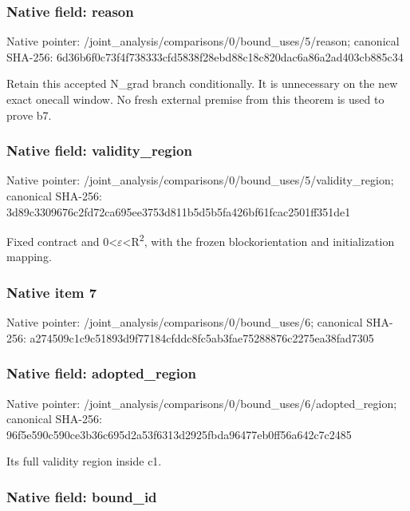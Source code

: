 \documentclass[10pt,a4paper]{article}
\begin{document}
\subsubsection{Native field: reason}


Native pointer: /joint\_analysis/comparis\allowbreak{}ons/0/bound\_uses/5/reaso\allowbreak{}n; canonical SHA-256: 6d36b6f0c73f4f738333cfd5\allowbreak{}838f28ebd88c18c820dac6a8\allowbreak{}6a2ad403cb885c34


Retain this accepted N\_grad branch conditionally. It is unnecessary on the new exact onecall window. No fresh external premise from this theorem is used to prove b7.


\subsubsection{Native field: validity\_region}


Native pointer: /joint\_analysis/comparis\allowbreak{}ons/0/bound\_uses/5/valid\allowbreak{}ity\_region; canonical SHA-256: 3d89c3309676c2fd72ca695e\allowbreak{}e3753d811b5d5b5fa426bf61\allowbreak{}fcac2501ff351de1


Fixed contract and 0<\ensuremath{\varepsilon}<R\textsuperscript{2}, with the frozen blockorientation and initialization mapping.


\subsubsection{Native item 7}


Native pointer: /joint\_analysis/comparis\allowbreak{}ons/0/bound\_uses/6; canonical SHA-256: a274509c1c9c51893d9f7718\allowbreak{}4cfddc8fc5ab3fae75288876\allowbreak{}c2275ea38fad7305



\subsubsection{Native field: adopted\_region}


Native pointer: /joint\_analysis/comparis\allowbreak{}ons/0/bound\_uses/6/adopt\allowbreak{}ed\_region; canonical SHA-256: 96f5e590c590ce3b36c695d2\allowbreak{}a53f6313d2925fbda96477eb\allowbreak{}0ff56a642c7c2485


Its full validity region inside c1.


\subsubsection{Native field: bound\_id}
\end{document}
